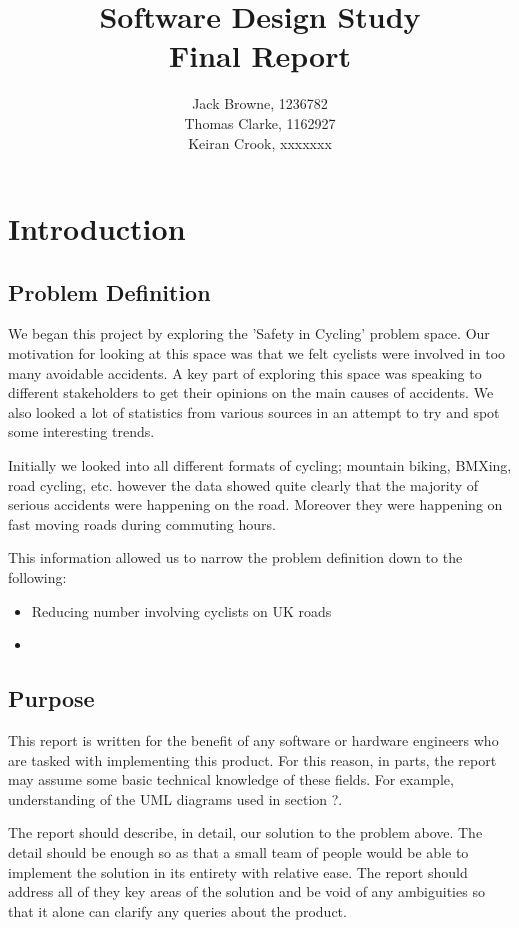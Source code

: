 \documentclass[]{report}
\title{Software Design Study\\Final Report}
\author{Jack Browne, 1236782\\Thomas Clarke, 1162927\\Keiran Crook, xxxxxxx}
\begin{document}
\maketitle

\tableofcontents

\chapter{Introduction}
\section{Problem Definition}
We began this project by exploring the 'Safety in Cycling' problem space. Our motivation for looking at this space was that we felt cyclists were involved in too many avoidable accidents. 
A key part of exploring this space was speaking to different stakeholders to get their opinions on the main causes of accidents. We also looked a lot of statistics from various sources in an attempt to try and spot some interesting trends.

Initially we looked into all different formats of cycling; mountain biking, BMXing, road cycling, etc. however the data showed quite clearly that the majority of serious accidents were happening on the road. Moreover they were happening on fast moving roads during commuting hours.

This information allowed us to narrow the problem definition down to the following:
\begin{itemize}
  \item Reducing number involving cyclists on UK roads
  \item 
\end{itemize}
\section{Purpose}
This report is written for the benefit of any software or hardware engineers who are tasked with implementing this product. For this reason, in parts, the report may assume some basic technical knowledge of these fields. For example, understanding of the UML diagrams used in section ?.

The report should describe, in detail, our solution to the problem above. The detail should be enough so as that a small team of people would be able to implement the solution in its entirety with relative ease. The report should address all of they key areas of the solution and be void of any ambiguities so that it alone can clarify any queries about the product.
\end{document}
